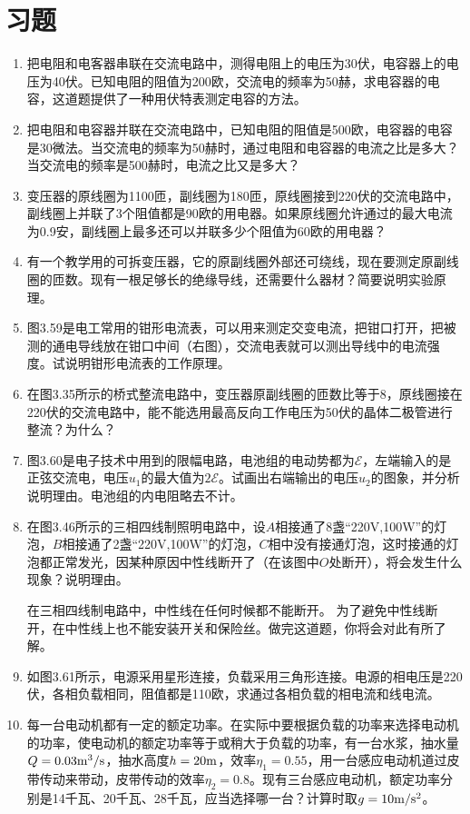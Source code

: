 \section*{习题}
\begin{enumerate}
    \item 把电阻和电客器串联在交流电路中，测得电阻上的电压为30伏，电容器上的电压为40伏。已知电阻的阻值为200欧，交流电的频率为50赫，求电容器的电容，这道题提供了一种用伏特表测定电容的方法。
    \item 把电阻和电容器并联在交流电路中，已知电阻的阻值是500欧，电容器的电容是30微法。当交流电的频率为50赫时，通过电阻和电容器的电流之比是多大？当交流电的频率是500赫时，电流之比又是多大？
    \item 变压器的原线圈为1100匝，副线圈为180匝，原线圈接到220伏的交流电路中，副线圈上并联了3个阻值都是90欧的用电器。如果原线圈允许通过的最大电流为0.9安，副线圈上最多还可以并联多少个阻值为60欧的用电器？
    \item 有一个教学用的可拆变压器，它的原副线圈外部还可绕线，现在要测定原副线圈的匝数。现有一根足够长的绝缘导线，还需要什么器材？简要说明实验原理。
    \item 图3.59是电工常用的钳形电流表，可以用来测定交变电流，把钳口打开，把被测的通电导线放在钳口中间（右图），交流电表就可以测出导线中的电流强度。试说明钳形电流表的工作原理。
    \item 在图3.35所示的桥式整流电路中，变压器原副线圈的匝数比等于8，原线圈接在220伏的交流电路中，能不能选用最高反向工作电压为50伏的晶体二极管进行整流？为什么？
    \item 图3.60是电子技术中用到的限幅电路，电池组的电动势都为$\mathcal{E}$，左端输入的是正弦交流电，电压$u_1$的最大值为$2\mathcal{E}$。试画出右端输出的电压$u_2$的图象，并分析说明理由。电池组的内电阻略去不计。
    \item 在图3.46所示的三相四线制照明电路中，设$A$相接通了8盏“220V,100W”的灯泡，$B$相接通了2盏“220V,100W”的灯泡，$C$相中没有接通灯泡，这时接通的灯泡都正常发光，因某种原因中性线断开了（在该图中$O$处断开），将会发生什么现象？说明理由。
    
    在三相四线制电路中，中性线在任何时候都不能断开。
    为了避免中性线断开，在中性线上也不能安装开关和保险丝。做完这道题，你将会对此有所了解。
    \item 如图3.61所示，电源采用星形连接，负载采用三角形连接。电源的相电压是220伏，各相负载相同，阻值都是110欧，求通过各相负载的相电流和线电流。
    \item 每一台电动机都有一定的额定功率。在实际中要根据负载的功率来选择电动机的功率，使电动机的额定功率等于或稍大于负载的功率，有一台水浆，抽水量$Q=0.03{\rm m^3}/{\rm s}$，抽水高度$h=20{\rm m}$，效率$\eta_1=0.55$，用一台感应电动机道过皮带传动来带动，皮带传动的效率$\eta_2=0.8$。现有三台感应电动机，额定功率分别是14千瓦、20千瓦、28千瓦，应当选择哪一台？计算时取$g=10\text{m}/\text{s}^2$。
\end{enumerate}

































